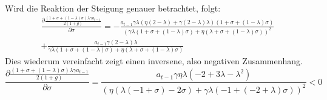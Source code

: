 \\
Wird die Reaktion der Steigung genauer betrachtet, folgt:
\begin{equation}
\begin{split} 
\frac{\partial\frac{(1+\sigma+(1-\lambda)\sigma)\lambda\gamma a_{t-1}}{2(1+g)}}{\partial\sigma} =- \frac{a_{t-1} \gamma \lambda ( \eta (2- \lambda)+\gamma(2-\lambda) \lambda)(1+ \sigma + (1- \lambda) \sigma)}{(\gamma \lambda (1+ \sigma + (1- \lambda) \sigma) + \eta (\lambda + \sigma +(1- \lambda) \sigma))^{2}}\\
+ \frac{a_{t-1} \gamma (2- \lambda) \lambda}{ \gamma \lambda (1+ \sigma + (1- \lambda) \sigma) + \eta (\lambda + \sigma +(1- \lambda) \sigma)}
\end{split}
\end{equation}
Dies wiederum vereinfacht zeigt einen inversene, also negativen Zusammenhang. 
\begin{equation}
\frac{\partial\frac{(1+\sigma+(1-\lambda)\sigma)\lambda\gamma a_{t-1}}{2(1+g)}}{\partial\sigma} =\frac{a_{t-1}\gamma \eta \lambda (-2 +3 \lambda -\lambda^{2})}{(\eta (\lambda (-1 + \sigma) -2 \sigma) + \gamma \lambda (-1+(-2 + \lambda) \sigma))^{2}}<0
\end{equation}
